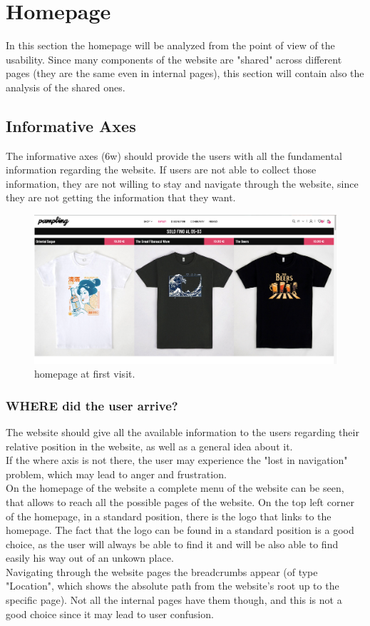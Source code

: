 \section{Homepage}
In this section the homepage will be analyzed from the point of view of the usability. 
Since many components of the website are "shared" across different pages (they are the same even in internal pages), this section will contain also the analysis of the shared ones.

\subsection{Informative Axes}
The informative axes (6w) should provide the users with all the fundamental information regarding the website. 
If users are not able to collect those information, they are not willing to stay and navigate through the website, since they are not getting the information that they want.

\begin{figure}[h!]
	\centering
	\includegraphics[scale=0.225]{images/homepage-first.png}
	\caption{homepage at first visit.}
	\label{fig:homepage-first}
\end{figure}

\subsubsection{WHERE did the user arrive?}
The website should give all the available information to the users regarding their relative position in the website, as well as a general idea about it. \\

If the where axis is not there, the user may experience the "lost in navigation" problem, which may lead to anger and frustration.\\
On the homepage of the website a complete menu of the website can be seen, that allows to reach all the possible pages of the website. 
On the top left corner of the homepage, in a standard position, there is the logo that links to the homepage.
The fact that the logo can be found in a standard position is a good choice, as the user will always be able to find it
and will be also able to find easily his way out of an unkown place.\\ 
Navigating through the website pages the breadcrumbs appear (of type "Location", which shows the absolute path from the website's root up to the specific page).
Not all the internal pages have them though, and this is not a good choice since it may lead to user confusion.

